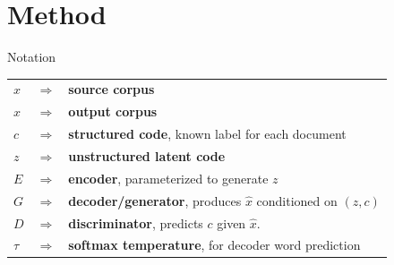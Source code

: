\documentclass{beamer}
\begin{document}
\section{Method}
\begin{frame}{Notation}
  \large
  \begin{tabular}{ l c l }
    $x$ & $\Rightarrow$ & \textbf{source corpus} \\
    $\hat{x}$ & $\Rightarrow$ & \textbf{output corpus} \\
    $c$ & $\Rightarrow$ & \textbf{structured code}, known label for each document \\
    $z$ & $\Rightarrow$ & \textbf{unstructured latent code} \\
    $E$ & $\Rightarrow$ & \textbf{encoder}, parameterized to generate $z$  \\
    $G$ & $\Rightarrow$ & \textbf{decoder/generator}, produces $\hat{x}$ conditioned on $(z, c)$ \\
    $D$ & $\Rightarrow$ & \textbf{discriminator}, predicts $c$ given $\hat{x}$. \\
    $\tau$ & $\Rightarrow$ & \textbf{softmax temperature}, for decoder word prediction \\
  \end{tabular}
\end{frame}
\end{document}
